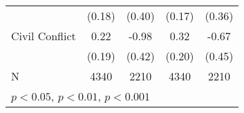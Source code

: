 \begin{table}[htbp]
\begin{tabular}{l*{4}{c}}
                    &      (0.18)         &      (0.40)         &      (0.17)         &      (0.36)         \\
Civil Conflict      &        0.22         &       -0.98\sym{*}  &        0.32         &       -0.67         \\
                    &      (0.19)         &      (0.42)         &      (0.20)         &      (0.45)         \\
\hline
N                   &        4340         &        2210         &        4340         &        2210         \\
\hline\hline
\multicolumn{5}{l}{\footnotesize \sym{*} \(p<0.05\), \sym{**} \(p<0.01\), \sym{***} \(p<0.001\)}\\
\end{tabular}
\end{table}

